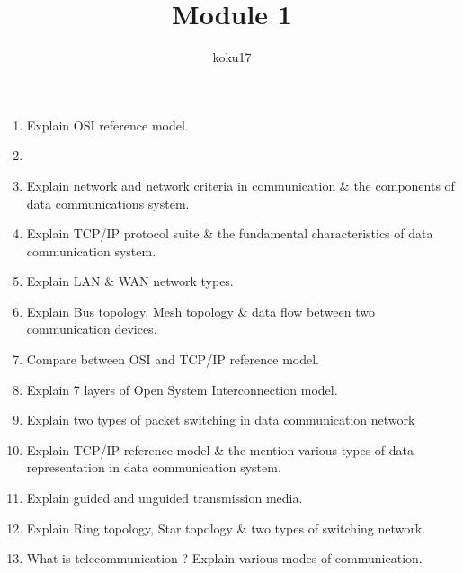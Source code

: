 \documentclass{article}
\author{koku17}
\title{Module 1}
\newcommand{\answer}{\item [$\rightarrow$]}
\begin{document}
     \maketitle \newpage
     \tableofcontents \newpage

	\begin{enumerate}
		\item Explain OSI reference model.
		\answer ~ \vspace{-1em}
			
		\item Explain network and network criteria in communication \& the components of data communications
			system.
		\item Explain TCP/IP protocol suite \& the fundamental characteristics of data communication system.
		\item Explain LAN \& WAN network types.
		\item Explain Bus topology, Mesh topology \& data flow between two communication devices.
		\item Compare between OSI and TCP/IP reference model.
		\item Explain 7 layers of Open System Interconnection model.
		\item Explain two types of packet switching in data communication network
		\item Explain TCP/IP reference model \& the mention various types of data representation in data
			communication system.
		\item Explain guided and unguided transmission media.
		\item Explain Ring topology, Star topology \& two types of switching network.
		\item What is telecommunication ? Explain various modes of communication.
	\end{enumerate}
\end{document}
